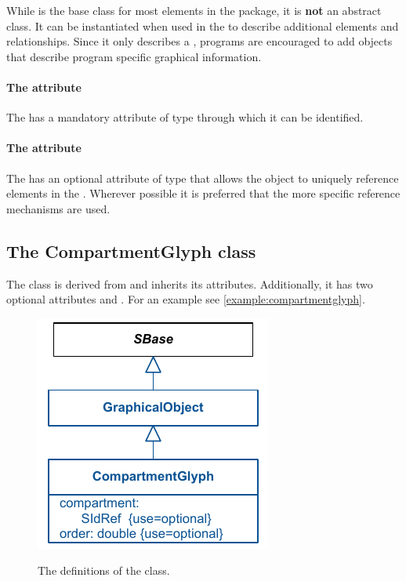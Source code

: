 While \GraphicalObject is the base class for most elements in the \Layout 
package, it is \textbf{not} an abstract class. It can be instantiated when used 
in the  to describe additional 
elements and relationships. Since it only describes a \BoundingBox, programs 
are encouraged to add \Annotation objects that describe program 
specific graphical information. 

\paragraph{The  attribute}
The \GraphicalObject has a mandatory  attribute of type 
 through which it can be identified. 


\paragraph{The  attribute}
The \GraphicalObject has an optional  attribute of type 
 that allows the object to uniquely reference elements 
in the \Model. Wherever possible it is preferred that the more specific 
reference mechanisms are used. 


\subsection{The CompartmentGlyph class }
\label{compartmentglyph-class}
The \CompartmentGlyph class is derived from \GraphicalObject and 
inherits its attributes. Additionally, it has two optional attributes 
 and . For an example see 
\ref{example:compartmentglyph}. 



\begin{figure}[!ht]
\includegraphics{uml/layout-compartmentglyph-uml}\\
\label{uml:compartmentglyph}
\caption{The definitions of the \CompartmentGlyph class.}
\end{figure}


